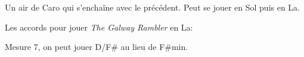 Un air de Caro qui s'enchaîne avec le précédent. Peut se jouer en Sol puis en
La.

\chords{
  \GMaj
  \CMaj
  \DinG
  \Amin
  \Emin
}

\tune

Les accords pour jouer \emph{The Galway Rambler} en La:

\chords{
  \AMaj
  \DMaj
  \EMaj
  \Fsmin
  \Bmin
}

Mesure 7, on peut jouer D/F\# au lieu de F\#min.



